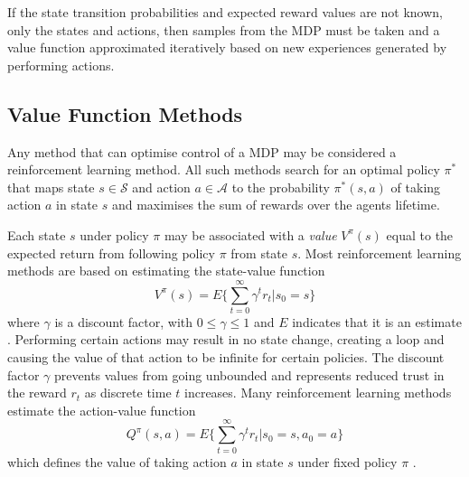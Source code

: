 If the state transition probabilities and expected reward values are not known,
only the states and actions, then samples from the MDP must be taken and a value
function approximated iteratively based on new experiences generated by
performing actions.

\subsection{Value Function Methods}
\label{sec:valuebased}
Any method that can optimise control of a MDP may be considered a reinforcement
learning method.  All such methods search for an optimal
policy $\pi^*$ that maps state $s \in \mathscr{S}$ and action $a \in
\mathscr{A}$ to the probability $\pi^*(s,a)$ of taking action $a$ in state $s$
and maximises the sum of rewards over the agents lifetime.

Each state $s$ under policy $\pi$ may be associated with a \textit{value}
$V^\pi(s)$ equal to the expected return from following policy $\pi$ from state
$s$.  Most reinforcement learning methods are based on estimating the
state-value function
\begin{equation}
\label{eq:statevalue}
V^\pi(s) = E \Bigg\lbrace \sum^\infty_{t=0} \gamma^t r_t \Bigg\vert s_0 = s
\Bigg\rbrace
\end{equation}
where $\gamma$ is a discount factor, with $0\leq \gamma \leq 1$ and $E$
indicates that it is an estimate \cite{suttonbarto:1998}. Performing certain
actions may result in no state change, creating a loop and causing the value of
that action to be infinite for certain policies. The discount factor $\gamma$
prevents values from going unbounded and represents reduced trust in the reward
$r_t$ as discrete time $t$ increases.  Many reinforcement learning methods
estimate the action-value function
\begin{equation}
\label{eq:actionvalue}
Q^\pi(s,a) = E \Bigg\lbrace \sum^\infty_{t=0} \gamma^t r_t \Bigg\vert s_0 = s,
a_0 = a \Bigg\rbrace
\end{equation}
which defines the value of taking action $a$ in state $s$ under fixed policy
$\pi$ \cite{suttonbarto:1998}.

